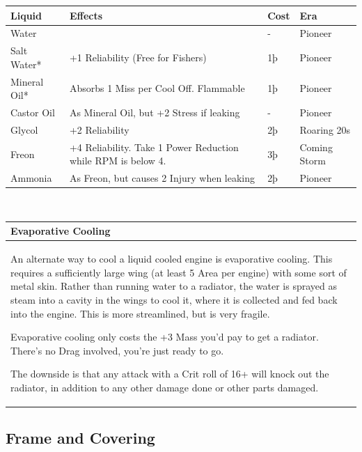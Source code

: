 \documentclass{article}
\begin{document}
\begin{tabular}{|l|l|l|l|}
    \hline
    Liquid       & Effects                                                      & Cost & Era         \\\hline
    Water        &                                                              & -    & Pioneer     \\\hline
    Salt Water*  & +1 Reliability (Free for Fishers)                            & 1þ   & Pioneer     \\\hline
    Mineral Oil* & Absorbs 1 Miss per Cool Off. Flammable                       & 1þ   & Pioneer     \\\hline
    Castor Oil   & As Mineral Oil, but +2 Stress if leaking                     & -    & Pioneer     \\\hline
    Glycol       & +2 Reliability                                               & 2þ   & Roaring 20s \\\hline
    Freon        & +4 Reliability. Take 1 Power Reduction while RPM is below 4. &
    3þ           & Coming Storm                                                                      \\\hline
    Ammonia      & As Freon, but causes 2 Injury when leaking                   & 2þ   & Pioneer     \\\hline
\end{tabular}
\\
\begin{tabular}{|l|}
    \hline
    Evaporative Cooling \\\hline

    An alternate way to cool a liquid cooled engine is evaporative cooling.
    This requires a sufficiently large wing (at least 5 Area per engine)
    with some sort of metal skin. Rather than running water to a radiator,
    the water is sprayed as steam into a cavity in the wings to cool it,
    where it is collected and fed back into the engine. This is more
    streamlined, but is very fragile.

    Evaporative cooling only costs the +3 Mass you'd pay to get a radiator.
    There's no Drag involved, you're just ready to go.

    The downside is that any attack with a Crit roll of 16+ will knock out
    the radiator, in addition to any other damage done or other parts
    damaged.            \\\hline
\end{tabular}

\subsection{Frame and Covering}
\label{_Frame_and_Covering}
\end{document}
